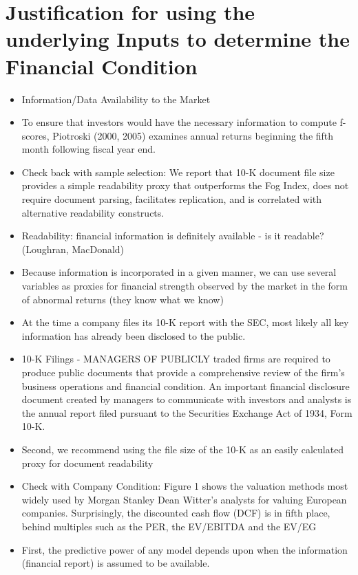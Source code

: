 \documentclass[12pt]{article}
\begin{document}
\section{Justification for using the underlying Inputs to determine the Financial Condition}

    \begin{itemize}

        \item Information/Data Availability to the Market
        
        \item To ensure that investors would have the necessary information to compute f-scores, Piotroski (2000, 2005) examines annual returns beginning the fifth month following fiscal year end. \citep{Choi2012}
        
        \item Check back with sample selection: We report that 10-K document file size provides a simple readability proxy that outperforms the Fog Index, does not require document parsing, facilitates replication, and is correlated with alternative readability constructs.\citep{Loughran2014}

        \item Readability: financial information is definitely available - is it readable? (Loughran, MacDonald)
        
        \item Because information is incorporated in a given manner, we can use several variables as proxies for financial strength observed by the market in the form of abnormal returns (they know what we know)
        
        \item At the time a company files its 10-K report with the SEC, most likely all key information has already been disclosed to the public.\citep{You2009}
        
        \item 10-K Filings - MANAGERS OF PUBLICLY traded firms are required to produce public documents that provide a comprehensive review of the firm’s business operations and financial condition. An important financial disclosure document created by managers to communicate with investors and analysts is the annual report filed pursuant to the Securities Exchange Act of 1934, Form 10-K.\citep{Loughran2014}

        \item Second, we recommend using the file size of the 10-K as an easily calculated proxy for document readability \citep{Loughran2014}

        \item Check with Company Condition: Figure 1 shows the valuation methods most widely used by Morgan Stanley Dean Witter’s analysts for valuing European companies. Surprisingly, the discounted cash flow (DCF) is in fifth place, behind multiples such as the PER, the EV/EBITDA and the EV/EG \citep{Fernandez2001}
        
        \item First, the predictive power of any model depends upon when the information (financial report) is assumed to be available. \citep{Ohlson1980}
    \end{itemize}
\end{document}
